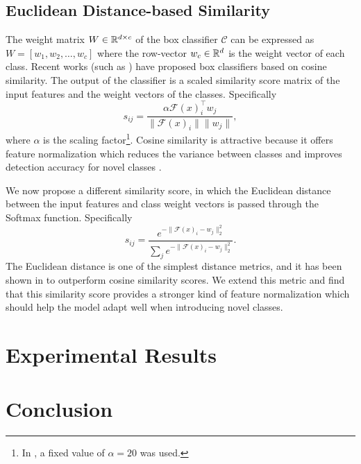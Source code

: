 \documentclass{article}
\begin{document}
\subsection{Euclidean Distance-based Similarity}
The weight matrix $W \in \mathbb{R}^{d \times c}$ of the box classifier $\mathcal{C}$ can be expressed as 
  $W = [w_1, w_2, \dots, w_c]$ 
where the row-vector  $w_c \in \mathbb{R}^d$ is the weight vector of each class.  
Recent works (such as \cite{VinyalsBLKW16,chen2019closer,qi2018low,gidaris2018dynamic}) have proposed 
box classifiers based on cosine similarity. The output of the classifier is a scaled similarity score matrix 
of the input features and the weight vectors of the classes. Specifically
\begin{equation}
  s_{ij} = \frac{\alpha \mathcal{F}(x)_i^\top w_j}{\| \mathcal{F}(x)_i \| \|w_j\|},
\end{equation}
where $\alpha$ is the scaling factor\footnote{In \cite{wang2020frustratingly}, a fixed value 
of $\alpha = 20$ was used.}. 
Cosine similarity is attractive because it offers feature normalization which reduces the 
variance between classes and improves detection accuracy for novel classes \cite{wang2020frustratingly}. 

We now propose a different similarity score, in which the Euclidean distance between the 
input features and class weight vectors is passed through the Softmax function. Specifically
\begin{equation}
  s_{ij} = \frac{e^{-\|\mathcal{F}(x)_i - w_j\|_2^2}}{\sum_{j} e^{-\|\mathcal{F}(x)_i - w_j\|_2^2}}.
\end{equation}
The Euclidean distance is one of the simplest distance metrics, and it has been shown in \cite{snell2017prototypical} 
to outperform cosine similarity scores. 
We extend this metric and find that this similarity score provides a stronger kind of feature normalization 
which should help the model adapt well when introducing novel classes. 

\section{Experimental Results}

\section{Conclusion}
\end{document}
